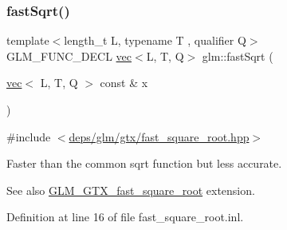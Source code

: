 \subsubsection{\texorpdfstring{fast\+Sqrt()}{fastSqrt()}\hspace{0.1cm}{\footnotesize\ttfamily [2/2]}}
{\footnotesize\ttfamily template$<$length\+\_\+t L, typename T , qualifier Q$>$ \\
G\+L\+M\+\_\+\+F\+U\+N\+C\+\_\+\+D\+E\+CL \hyperlink{structglm_1_1vec}{vec}$<$L, T, Q$>$ glm\+::fast\+Sqrt (\begin{DoxyParamCaption}\item[{\hyperlink{structglm_1_1vec}{vec}$<$ L, T, Q $>$ const \&}]{x }\end{DoxyParamCaption})}



{\ttfamily \#include $<$\hyperlink{fast__square__root_8hpp}{deps/glm/gtx/fast\+\_\+square\+\_\+root.\+hpp}$>$}

Faster than the common sqrt function but less accurate.

\begin{DoxySeeAlso}{See also}
\hyperlink{group__gtx__fast__square__root}{G\+L\+M\+\_\+\+G\+T\+X\+\_\+fast\+\_\+square\+\_\+root} extension. 
\end{DoxySeeAlso}


Definition at line 16 of file fast\+\_\+square\+\_\+root.\+inl.

